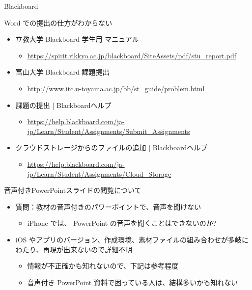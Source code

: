 \documentclass[a4j,10pt]{jsarticle}
\begin{document}
{\begin{frame}[label={sec:orgc119bb0},fragile]{Blackboard}
\begin{block}{Word での提出の仕方がわからない}
\begin{itemize}
\par
\item 立教大学 Blackboard 学生用 マニュアル
\begin{itemize}
\item \url{https://spirit.rikkyo.ac.jp/blackboard/SiteAssets/pdf/stu\_report.pdf}
\end{itemize}
\par
\item 富山大学 Blackboard 課題提出
\begin{itemize}
\item \url{http://www.itc.u-toyama.ac.jp/bb/st\_guide/problem.html}
\end{itemize}
\par
\item 課題の提出 | Blackboardヘルプ
\begin{itemize}
\item \url{https://help.blackboard.com/ja-jp/Learn/Student/Assignments/Submit\_Assignments}
\end{itemize}
\par
\item クラウドストレージからのファイルの追加 | Blackboardヘルプ
\begin{itemize}
\item \url{https://help.blackboard.com/ja-jp/Learn/Student/Assignments/Cloud\_Storage}
\end{itemize}
\end{itemize}
\end{block}
\par
\begin{block}{音声付きPowerPointスライドの閲覧について}
\begin{itemize}
\item 質問：教材の音声付きのパワーポイントで、音声を聞けない
\begin{itemize}
\item iPhone では、 PowerPoint の音声を聞くことはできないのか?
\end{itemize}
\par
\item iOS やアプリのバージョン、作成環境、素材ファイルの組み合わせが多岐にわたり、再現が出来ないので詳細不明
\begin{itemize}
\item 情報が不正確かも知れないので、下記は参考程度
\item 音声付き PowerPoint 資料で困っている人は、結構多いかも知れない
\end{itemize}
\end{itemize}

\end{block}
\end{frame}}
\end{document}

